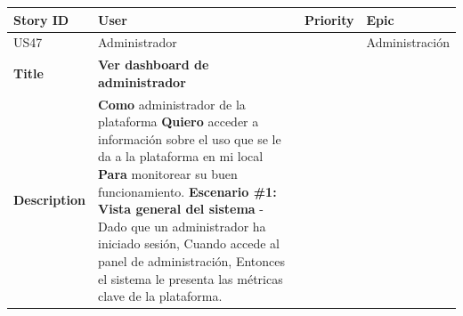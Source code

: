 {\def\LTcaptype{none} %
\begin{longtable}[]{@{}
  >{\raggedright\arraybackslash}p{}
  >{\raggedright\arraybackslash}p{}
  >{\raggedright\arraybackslash}p{}
  >{\raggedright\arraybackslash}p{}@{}}
\toprule\noalign{}
\begin{minipage}[b]{\linewidth}\raggedright
Story ID
\end{minipage} & \begin{minipage}[b]{\linewidth}\raggedright
User
\end{minipage} & \begin{minipage}[b]{\linewidth}\raggedright
Priority
\end{minipage} & \begin{minipage}[b]{\linewidth}\raggedright
Epic
\end{minipage} \\
\midrule\noalign{}
\endhead
\bottomrule\noalign{}
\endlastfoot
US47 & Administrador & 8 & Administración \\
\textbf{Title} & \textbf{Ver dashboard de administrador} & & \\
\textbf{Description} & \textbf{Como} administrador de la plataforma
\textbf{Quiero} acceder a información sobre el uso que se le da a la
plataforma en mi local \textbf{Para} monitorear su buen funcionamiento.
\textbf{Escenario \#1: Vista general del sistema} - Dado que un
administrador ha iniciado sesión, Cuando accede al panel de
administración, Entonces el sistema le presenta las métricas clave de la
plataforma. & & \\
\end{longtable}
}

